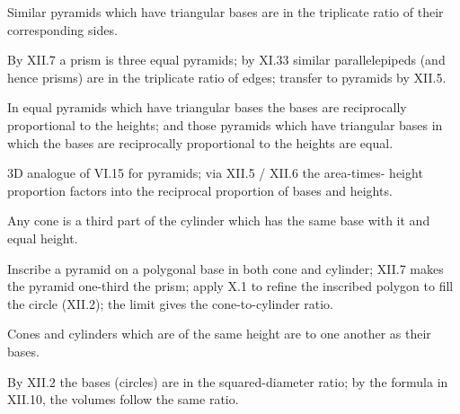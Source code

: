 \documentclass{rrxiv}
\begin{document}
\begin{claim}
\label{prop:XII.8}
Similar pyramids which have triangular bases are in the triplicate
ratio of their corresponding sides.
\end{claim}
\begin{evidence}
\label{ev:XII.8}
By XII.7 a prism is three equal pyramids; by XI.33 similar
parallelepipeds (and hence prisms) are in the triplicate ratio of
edges; transfer to pyramids by XII.5.
\end{evidence}

\begin{claim}
\label{prop:XII.9}
In equal pyramids which have triangular bases the bases are
reciprocally proportional to the heights; and those pyramids which
have triangular bases in which the bases are reciprocally
proportional to the heights are equal.
\end{claim}
\begin{evidence}
\label{ev:XII.9}
3D analogue of VI.15 for pyramids; via XII.5 / XII.6 the area-times-
height proportion factors into the reciprocal proportion of bases
and heights.
\end{evidence}

\begin{claim}
\label{prop:XII.10}
Any cone is a third part of the cylinder which has the same base
with it and equal height.
\end{claim}
\begin{evidence}
\label{ev:XII.10}
Inscribe a pyramid on a polygonal base in both cone and cylinder;
XII.7 makes the pyramid one-third the prism; apply X.1 to refine the
inscribed polygon to fill the circle (XII.2); the limit gives the
cone-to-cylinder ratio.
\end{evidence}

\begin{claim}
\label{prop:XII.11}
Cones and cylinders which are of the same height are to one another
as their bases.
\end{claim}
\begin{evidence}
\label{ev:XII.11}
By XII.2 the bases (circles) are in the squared-diameter ratio; by
the formula in XII.10, the volumes follow the same ratio.
\end{evidence}
\end{document}
